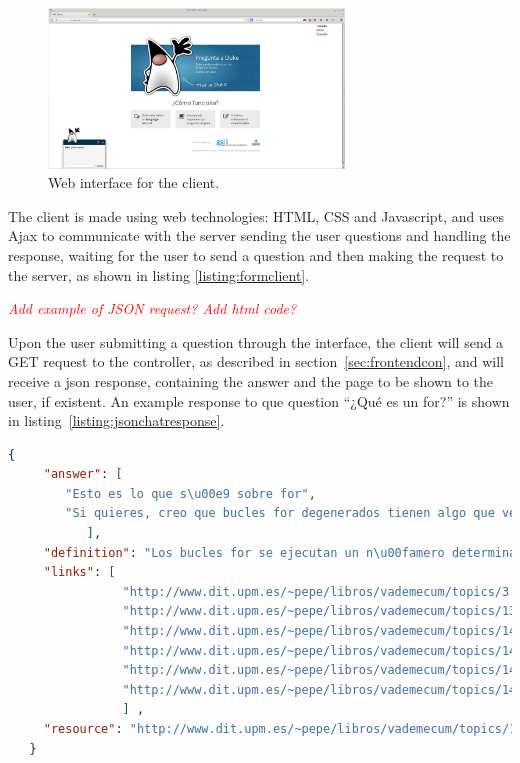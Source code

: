\begin{figure}[!htbp]
    \centering
    \includegraphics[width=0.7\textwidth]{img/screens/ask-client.png}
    \caption{Web interface for the client.}
    \label{fig:chat1}
\end{figure}

The client is made using web technologies: HTML, CSS and Javascript, and uses Ajax to communicate with the server sending the user questions and handling the response, waiting for the user to send a question and then making the request to the server, as shown in listing \ref{listing:formclient}.

\emph{\textcolor{red}{Add example of JSON request? Add html code?}}

\begin{center}
  
\end{center}

Upon the user submitting a question through the interface, the client will send a GET request to the controller, as described in section~\ref{sec:frontendcon}, and will receive a json response, containing the answer and the page to be shown to the user, if existent. An example response to que question ``¿Qué es un for?'' is shown in listing~\ref{listing:jsonchatresponse}.

\begin{center} 
  \begin{lstlisting}[language=json, caption=Example response for the chat client, label=listing:jsonchatresponse]
   {
     "answer": [
		"Esto es lo que s\u00e9 sobre for",
		"Si quieres, creo que bucles for degenerados tienen algo que ver con esto"
	       ],
     "definition": "Los bucles for se ejecutan un n\u00famero determinado de veces",
     "links": [
                "http://www.dit.upm.es/~pepe/libros/vademecum/topics/3.html",
                "http://www.dit.upm.es/~pepe/libros/vademecum/topics/139.html",
                "http://www.dit.upm.es/~pepe/libros/vademecum/topics/140.html",
                "http://www.dit.upm.es/~pepe/libros/vademecum/topics/141.html",
                "http://www.dit.upm.es/~pepe/libros/vademecum/topics/142.html",
                "http://www.dit.upm.es/~pepe/libros/vademecum/topics/143.html"
                ] ,
     "resource": "http://www.dit.upm.es/~pepe/libros/vademecum/topics/138.html"
   }  
  \end{lstlisting}
\end{center}

